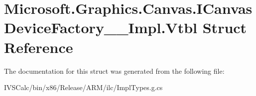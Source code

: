 \hypertarget{struct_microsoft_1_1_graphics_1_1_canvas_1_1_i_canvas_device_factory_____impl_1_1_vtbl}{}\section{Microsoft.\+Graphics.\+Canvas.\+I\+Canvas\+Device\+Factory\+\_\+\+\_\+\+Impl.\+Vtbl Struct Reference}
\label{struct_microsoft_1_1_graphics_1_1_canvas_1_1_i_canvas_device_factory_____impl_1_1_vtbl}


The documentation for this struct was generated from the following file\+:\begin{DoxyCompactItemize}
\item 
I\+V\+S\+Calc/bin/x86/\+Release/\+A\+R\+M/ilc/Impl\+Types.\+g.\+cs\end{DoxyCompactItemize}
